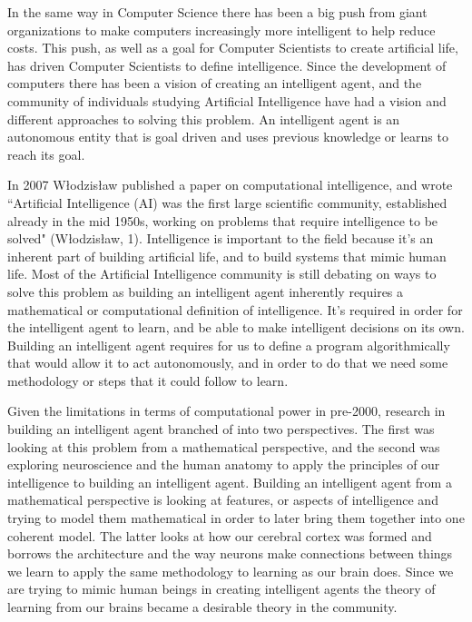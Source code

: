 \documentclass[11pt, oneside]{article}
\begin{document}
\par In the same way in Computer Science there has been a big push from giant organizations to make computers increasingly more intelligent to help reduce costs. This push, as well as a goal for Computer Scientists to create artificial life, has driven Computer Scientists to define intelligence. Since the development of computers there has been a vision of creating an intelligent agent, and the community of individuals studying Artificial Intelligence have had a vision and different approaches to solving this problem. An intelligent agent is an autonomous entity that is goal driven and uses previous knowledge or learns to reach its goal.

\par In 2007 W\l{}odzis\l{}aw published a paper on computational intelligence, and wrote ``Artificial Intelligence (AI) was the first large scientific community, established already in the mid 1950s, working on problems that require intelligence to be solved" (W\l{}odzis\l{}aw, 1). Intelligence is important to the field because it's an inherent part of building artificial life, and to build systems that mimic human life. Most of the Artificial Intelligence community is still debating on ways to solve this problem as building an intelligent agent inherently requires a mathematical or computational definition of intelligence. It's required in order for the intelligent agent to learn, and be able to make intelligent decisions on its own. Building an intelligent agent requires for us to define a program algorithmically that would allow it to act autonomously, and in order to do that we need some methodology or steps that it could follow to learn.

\par Given the limitations in terms of computational power in pre-2000, research in building an intelligent agent branched of into two perspectives. The first was looking at this problem from a mathematical perspective, and the second was exploring neuroscience and the human anatomy to apply the principles of our intelligence to building an intelligent agent. Building an intelligent agent from a mathematical perspective is looking at features, or aspects of intelligence and trying to model them mathematical in order to later bring them together into one coherent model. The latter looks at how our cerebral cortex was formed and borrows the architecture and the way neurons make connections between things we learn to apply the same methodology to learning as our brain does. Since we are trying to mimic human beings in creating intelligent agents the theory of learning from our brains became a desirable theory in the community. 
\end{document}
